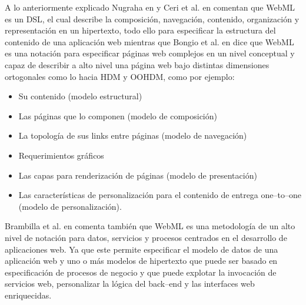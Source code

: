 \documentclass[oneside,12pt,a4paper]{memoir}%
\begin{document}
	A lo anteriormente explicado Nugraha en \cite{Nugraha2007} y
	Ceri et al. en \cite{Matera2003} comentan que \ac{WebML} es un \ac{DSL}, el
	cual describe la composici\'on, navegaci\'on, contenido, organizaci\'on y representaci\'on en un
	hipertexto, todo ello para especificar la estructura del contenido de una
	aplicaci\'on web mientras que Bongio et al. en \cite{Ceri2000} dice que \ac{WebML} es una
	notaci\'on para especificar p\'aginas web complejos en un nivel conceptual y capaz de
	describir a alto nivel una p\'agina web bajo distintas dimensiones ortogonales
	como lo hacia HDM y OOHDM, como por ejemplo:
	
	\begin{itemize}
	  \item Su contenido (modelo estructural)
	  \item Las p\'aginas que lo componen (modelo de composici\'on)
	  \item La topolog\'ia de sus links entre p\'aginas (modelo de navegaci\'on)
	  \item Requerimientos gr\'aficos
	  \item Las capas para renderizaci\'on de p\'aginas (modelo de presentaci\'on)
	  \item Las caracter\'isticas de personalizaci\'on para el contenido de entrega
	  one--to--one (modelo de personalizaci\'on).
	\end{itemize}
	
	Brambilla et al. en \cite{Brambilla2010} comenta tambi\'en que \ac{WebML} es
	una metodolog\'ia de un alto nivel de notaci\'on para datos, servicios y procesos centrados en el desarrollo
	de aplicaciones web. Ya que este permite especificar el modelo de datos de una
	aplicaci\'on web y uno o m\'as modelos de hipertexto que puede ser basado en
	especificaci\'on de procesos de negocio y que puede explotar la invocaci\'on de
	servicios web, personalizar la l\'ogica del back--end y las interfaces web
	enriquecidas.
\end{document}
